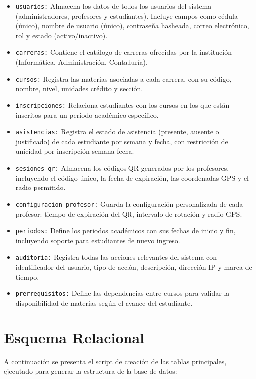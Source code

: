 \documentclass[12pt, letterpaper, oneside]{report}
\begin{document}
\begin{itemize}
  \item \texttt{usuarios:} Almacena los datos de todos los usuarios del sistema (administradores, profesores y estudiantes). Incluye campos como c\'edula (\'unico), nombre de usuario (\'unico), contrase\~na hasheada, correo electr\'onico, rol y estado (activo/inactivo).
  \item \texttt{carreras:} Contiene el cat\'alogo de carreras ofrecidas por la instituci\'on (Inform\'atica, Administraci\'on, Contadur\'ia).
  \item \texttt{cursos:} Registra las materias asociadas a cada carrera, con su c\'odigo, nombre, nivel, unidades cr\'edito y secci\'on.
  \item \texttt{inscripciones:} Relaciona estudiantes con los cursos en los que est\'an inscritos para un periodo acad\'emico espec\'ifico.
  \item \texttt{asistencias:} Registra el estado de asistencia (presente, ausente o justificado) de cada estudiante por semana y fecha, con restricci\'on de unicidad por inscripci\'on-semana-fecha.
  \item \texttt{sesiones\_qr:} Almacena los c\'odigos QR generados por los profesores, incluyendo el c\'odigo \'unico, la fecha de expiraci\'on, las coordenadas GPS y el radio permitido.
  \item \texttt{configuracion\_profesor:} Guarda la configuraci\'on personalizada de cada profesor: tiempo de expiraci\'on del QR, intervalo de rotaci\'on y radio GPS.
  \item \texttt{periodos:} Define los periodos acad\'emicos con sus fechas de inicio y fin, incluyendo soporte para estudiantes de nuevo ingreso.
  \item \texttt{auditoria:} Registra todas las acciones relevantes del sistema con identificador del usuario, tipo de acci\'on, descripci\'on, direcci\'on IP y marca de tiempo.
  \item \texttt{prerrequisitos:} Define las dependencias entre cursos para validar la disponibilidad de materias seg\'un el avance del estudiante.
\end{itemize}

\section{Esquema Relacional}

A continuaci\'on se presenta el script de creaci\'on de las tablas principales, ejecutado para generar la estructura de la base de datos:
\end{document}
